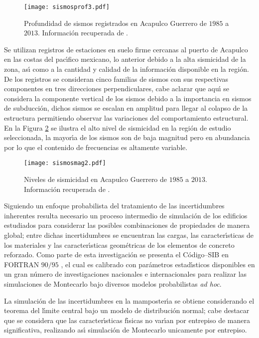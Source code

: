 \begin{figure}[htbp]
	\centering
		\texttt{[image: sismosprof3.pdf]}
	\caption{Profundidad de sismos registrados en Acapulco Guerrero de $1985$ a $2013$. Informaci\'on recuperada de \cite{USGS2013}.}
	\label{figsis:fig4}
\end{figure}

Se utilizan registros de estaciones en suelo firme cercanas al puerto de Acapulco en las costas del pac\'{\i}fico mexicano, lo anterior debido a la alta sismicidad de la zona, as\'{\i} como a la cantidad y calidad de la informaci\'on disponible en la regi\'on. De los registros se consideran cinco familias de sismos con sus respectivas componentes en tres direcciones perpendiculares, cabe aclarar que aqu\'{\i} se considera la componente vertical de los sismos debido a la importancia en sismos de subducci\'on, dichos sismos se escalan en amplitud para llegar al colapso de la estructura permitiendo observar las variaciones del comportamiento estructural. En la Figura \ref{figsis:figg1} se ilustra el alto nivel de sismicidad en la regi\'on de estudio seleccionada, la mayor\'{\i}a de los sismos son de baja magnitud pero en abundancia por lo que el contenido de frecuencias es altamente variable.

\begin{figure}[htbp]
	\centering
		\texttt{[image: sismosmag2.pdf]}
	\caption{Niveles de sismicidad en Acapulco Guerrero de $1985$ a $2013$. Informaci\'on recuperada de \cite{USGS2013}.}
	\label{figsis:figg1}
\end{figure}

Siguiendo un enfoque probabilista del tratamiento de las incertidumbres inherentes resulta necesario un proceso intermedio de simulaci\'on de los edificios estudiados para considerar las posibles combinaciones de propiedades de manera global; entre dichas incertidumbres se encuentran las cargas, las caracter\'{\i}sticas de los materiales y las caracter\'{\i}sticas geom\'etricas de los elementos de concreto reforzado. Como parte de esta investigaci\'on se presenta el C\'odigo--SIB en FORTRAN $90/95$ \cite{SIB2013}, el cual es calibrado con par\'ametros estad\'{\i}sticos disponibles en un gran n\'umero de investigaciones nacionales e internacionales \cite{PC1973,MG1970,MSMG1979,CJM1985,RB1996,LPMR2006} para realizar las simulaciones de Montecarlo bajo diversos modelos probabilistas \textit{ad hoc}.

La simulaci\'on de las incertidumbres en la mamposter\'{\i}a se obtiene considerando el teorema del l\'{\i}mite central bajo un modelo de distribuci\'on normal; cabe destacar que se considera que las caracter\'{\i}sticas  f\'{\i}sicas no var\'{\i}an por entrepiso de manera significativa, realizando as\'{\i} simulaci\'on de Montecarlo unicamente por entrepiso.

